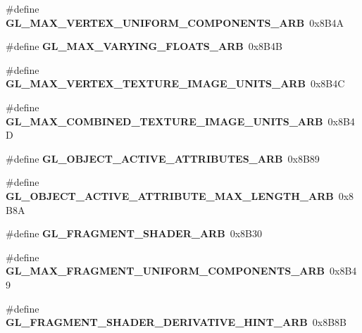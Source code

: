 \begin{DoxyCompactItemize}
\item 
\#define {\bfseries G\+L\+\_\+\+M\+A\+X\+\_\+\+V\+E\+R\+T\+E\+X\+\_\+\+U\+N\+I\+F\+O\+R\+M\+\_\+\+C\+O\+M\+P\+O\+N\+E\+N\+T\+S\+\_\+\+A\+R\+B}~0x8\+B4\+A\label{_s_d_l__opengl_8h_a850faeb33d8331c55479e63e30d4a1df}

\item 
\#define {\bfseries G\+L\+\_\+\+M\+A\+X\+\_\+\+V\+A\+R\+Y\+I\+N\+G\+\_\+\+F\+L\+O\+A\+T\+S\+\_\+\+A\+R\+B}~0x8\+B4\+B\label{_s_d_l__opengl_8h_ad0c4f1236242ba4b674f5eb54a528a32}

\item 
\#define {\bfseries G\+L\+\_\+\+M\+A\+X\+\_\+\+V\+E\+R\+T\+E\+X\+\_\+\+T\+E\+X\+T\+U\+R\+E\+\_\+\+I\+M\+A\+G\+E\+\_\+\+U\+N\+I\+T\+S\+\_\+\+A\+R\+B}~0x8\+B4\+C\label{_s_d_l__opengl_8h_af5eaa1888813d3c68513faeb334bb346}

\item 
\#define {\bfseries G\+L\+\_\+\+M\+A\+X\+\_\+\+C\+O\+M\+B\+I\+N\+E\+D\+\_\+\+T\+E\+X\+T\+U\+R\+E\+\_\+\+I\+M\+A\+G\+E\+\_\+\+U\+N\+I\+T\+S\+\_\+\+A\+R\+B}~0x8\+B4\+D\label{_s_d_l__opengl_8h_ad35a87121920e6462b479e26dfaf69a5}

\item 
\#define {\bfseries G\+L\+\_\+\+O\+B\+J\+E\+C\+T\+\_\+\+A\+C\+T\+I\+V\+E\+\_\+\+A\+T\+T\+R\+I\+B\+U\+T\+E\+S\+\_\+\+A\+R\+B}~0x8\+B89\label{_s_d_l__opengl_8h_a2a5a01258b0bb907aa9ff7341a69a3cd}

\item 
\#define {\bfseries G\+L\+\_\+\+O\+B\+J\+E\+C\+T\+\_\+\+A\+C\+T\+I\+V\+E\+\_\+\+A\+T\+T\+R\+I\+B\+U\+T\+E\+\_\+\+M\+A\+X\+\_\+\+L\+E\+N\+G\+T\+H\+\_\+\+A\+R\+B}~0x8\+B8\+A\label{_s_d_l__opengl_8h_a50f55f0914b850552d894ca5d684009a}

\item 
\#define {\bfseries G\+L\+\_\+\+F\+R\+A\+G\+M\+E\+N\+T\+\_\+\+S\+H\+A\+D\+E\+R\+\_\+\+A\+R\+B}~0x8\+B30\label{_s_d_l__opengl_8h_a5cc824276a0a610a920ab9e3a0bed3e3}

\item 
\#define {\bfseries G\+L\+\_\+\+M\+A\+X\+\_\+\+F\+R\+A\+G\+M\+E\+N\+T\+\_\+\+U\+N\+I\+F\+O\+R\+M\+\_\+\+C\+O\+M\+P\+O\+N\+E\+N\+T\+S\+\_\+\+A\+R\+B}~0x8\+B49\label{_s_d_l__opengl_8h_aaf52509949799afbaee793e9678f9e80}

\item 
\#define {\bfseries G\+L\+\_\+\+F\+R\+A\+G\+M\+E\+N\+T\+\_\+\+S\+H\+A\+D\+E\+R\+\_\+\+D\+E\+R\+I\+V\+A\+T\+I\+V\+E\+\_\+\+H\+I\+N\+T\+\_\+\+A\+R\+B}~0x8\+B8\+B\label{_s_d_l__opengl_8h_af8bb3a5a8535bdb7921c17cdcaab89fa}


\end{DoxyCompactItemize}
